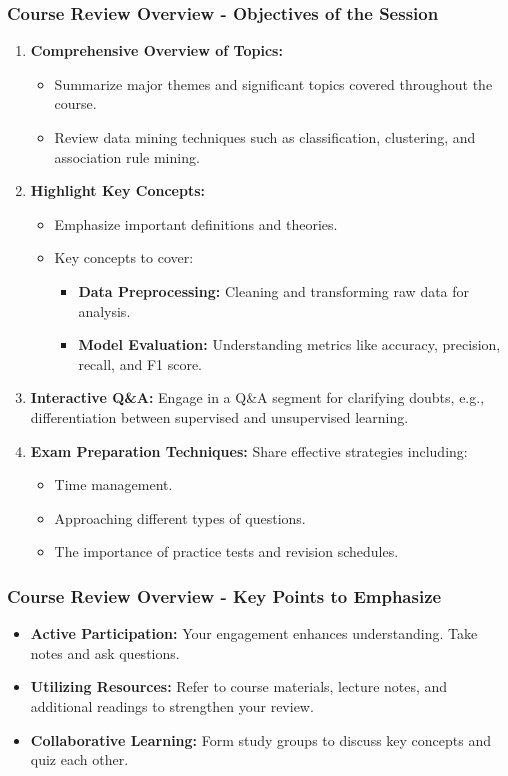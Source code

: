 \documentclass[aspectratio=169]{beamer}
\begin{document}
\begin{frame}[fragile]
    \frametitle{Course Review Overview - Objectives of the Session}
    \begin{enumerate}
        \item \textbf{Comprehensive Overview of Topics:}
        \begin{itemize}
            \item Summarize major themes and significant topics covered throughout the course.
            \item Review data mining techniques such as classification, clustering, and association rule mining.
        \end{itemize}

        \item \textbf{Highlight Key Concepts:}
        \begin{itemize}
            \item Emphasize important definitions and theories.
            \item Key concepts to cover:
            \begin{itemize}
                \item \textbf{Data Preprocessing:} Cleaning and transforming raw data for analysis.
                \item \textbf{Model Evaluation:} Understanding metrics like accuracy, precision, recall, and F1 score.
            \end{itemize}
        \end{itemize}

        \item \textbf{Interactive Q\&A:} Engage in a Q\&A segment for clarifying doubts, e.g., differentiation between supervised and unsupervised learning.

        \item \textbf{Exam Preparation Techniques:} Share effective strategies including:
        \begin{itemize}
            \item Time management.
            \item Approaching different types of questions.
            \item The importance of practice tests and revision schedules.
        \end{itemize}
    \end{enumerate}
\end{frame}

\begin{frame}[fragile]
    \frametitle{Course Review Overview - Key Points to Emphasize}
    \begin{itemize}
        \item \textbf{Active Participation:} Your engagement enhances understanding. Take notes and ask questions.
        \item \textbf{Utilizing Resources:} Refer to course materials, lecture notes, and additional readings to strengthen your review.
        \item \textbf{Collaborative Learning:} Form study groups to discuss key concepts and quiz each other.
    \end{itemize}
\end{frame}
\end{document}
